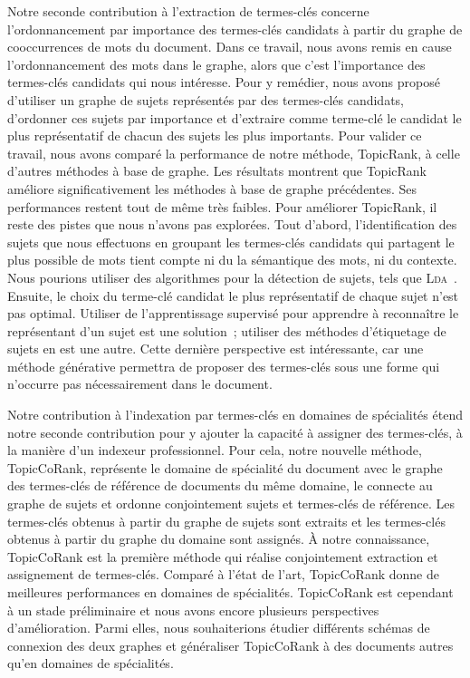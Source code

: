   Notre seconde contribution à l'extraction de termes-clés concerne
  l'ordonnancement par importance des termes-clés candidats à partir du graphe
  de cooccurrences de mots du document. Dans ce travail, nous avons remis en
  cause l'ordonnancement des mots dans le graphe, alors que c'est l'importance
  des termes-clés candidats qui nous intéresse. Pour y remédier, nous avons
  proposé d'utiliser un graphe de sujets représentés par des termes-clés
  candidats, d'ordonner ces sujets par importance et d'extraire comme terme-clé
  le candidat le plus représentatif de chacun des sujets les plus importants.
  Pour valider ce travail, nous avons comparé la performance de notre méthode,
  TopicRank, à celle d'autres méthodes à base de graphe. Les résultats montrent
  que TopicRank améliore significativement les méthodes à base de graphe
  précédentes. Ses performances restent tout de même très faibles. Pour
  améliorer TopicRank, il reste des pistes que nous n'avons pas explorées. Tout
  d'abord, l'identification des sujets que nous effectuons en groupant les
  termes-clés candidats qui partagent le plus possible de mots tient compte ni
  du la sémantique des mots, ni du contexte. Nous pourions utiliser des
  algorithmes pour la détection de sujets, tels que
  \textsc{Lda}~\cite{blei2003lda}. Ensuite, le choix du terme-clé candidat le
  plus représentatif de chaque sujet n'est pas optimal. Utiliser de
  l'apprentissage supervisé pour apprendre à reconnaître le représentant d'un
  sujet est une solution~; utiliser des méthodes d'étiquetage de sujets en est
  une autre. Cette dernière perspective est intéressante, car une méthode
  générative permettra de proposer des termes-clés sous une forme qui n'occurre
  pas nécessairement dans le document.

  Notre contribution à l'indexation par termes-clés en domaines de spécialités
  étend notre seconde contribution pour y ajouter la capacité à assigner des
  termes-clés, à la manière d'un indexeur professionnel. Pour cela, notre
  nouvelle méthode, TopicCoRank, représente le domaine de spécialité du
  document avec le graphe des termes-clés de référence de documents du même
  domaine, le connecte au graphe de sujets et ordonne conjointement sujets et
  termes-clés de référence. Les termes-clés obtenus à partir du graphe de sujets
  sont extraits et les termes-clés obtenus à partir du graphe du domaine sont
  assignés. À notre connaissance, TopicCoRank est la première méthode qui
  réalise conjointement extraction et assignement de termes-clés. Comparé à
  l'état de l'art, TopicCoRank donne de meilleures performances en domaines de
  spécialités. TopicCoRank est cependant à un stade préliminaire et nous avons
  encore plusieurs perspectives d'amélioration. Parmi elles, nous souhaiterions
  étudier différents schémas de connexion des deux graphes et généraliser
  TopicCoRank à des documents autres qu'en domaines de spécialités.

